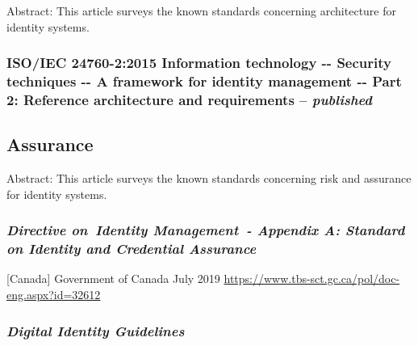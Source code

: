 Abstract: This article surveys the known standards concerning
architecture for identity systems.

\hypertarget{isoiec-24760-22015-information-technology----security-techniques----a-framework-for-identity-management----part-2-reference-architecture-and-requirements-published}{%
\subsubsection{\texorpdfstring{ISO/IEC 24760-2:2015 Information technology
-\/- Security techniques -\/- A framework for identity management -\/-
Part 2: Reference architecture and requirements --
\emph{published}}{ISO/IEC 24760-2:2015 Information technology -\/- Security techniques -\/- A framework for identity management -\/- Part 2: Reference architecture and requirements -- published}}\label{isoiec-24760-22015-information-technology----security-techniques----a-framework-for-identity-management----part-2-reference-architecture-and-requirements-published}}

\hypertarget{assurance}{%
\subsection{Assurance}\label{assurance}}

Abstract: This article surveys the known standards concerning risk and
assurance for identity systems.

\hypertarget{directive-onidentity-management--appendix-a-standard-on-identity-and-credential-assurance}{%
\subsubsection{\texorpdfstring{\emph{Directive on~Identity Management~-
Appendix A: Standard on Identity and Credential
Assurance}}{Directive on~Identity Management~- Appendix A: Standard on Identity and Credential Assurance}}\label{directive-onidentity-management--appendix-a-standard-on-identity-and-credential-assurance}}

{[}Canada{]} Government of Canada July 2019
\url{https://www.tbs-sct.gc.ca/pol/doc-eng.aspx?id=32612}

\hypertarget{digital-identity-guidelines}{%
\subsubsection{\texorpdfstring{\emph{Digital Identity
Guidelines}}{Digital Identity Guidelines}}\label{digital-identity-guidelines}}

